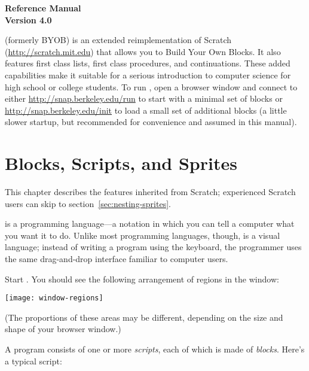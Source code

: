 \documentclass{report}
\begin{document}
\clearpage

\begin{center}
\bf \Huge \Snap{} Reference Manual \\
\huge Version 4.0
\vspace{40pt}
\end{center}

\Snap{} (formerly BYOB) is an extended reimplementation of Scratch (\url{http://scratch.mit.edu}) that allows you to Build Your Own Blocks. It also features first class lists, first class procedures, and continuations. These added capabilities make it suitable for a serious introduction to computer science for high school or college students.  To run \Snap{}, open a browser window and connect to either \url{http://snap.berkeley.edu/run} to start with a minimal set of blocks or \url{http://snap.berkeley.edu/init} to load a small set of additional blocks (a little slower startup, but recommended for convenience and assumed in this manual).

\clearpage

\chapter{Blocks, Scripts, and Sprites}

This chapter describes the \Snap{} features inherited from Scratch; experienced Scratch users can skip to section~\ref{sec:nesting-sprites}.

\Snap{} is a programming language---a notation in which you can tell a computer what you want it to do. Unlike most programming languages, though, \Snap{} is a visual language; instead of writing a program using the keyboard, the \Snap{} programmer uses the same drag-and-drop interface familiar to computer users.

Start \Snap{}. You should see the following arrangement of regions in the window:\nopagebreak

\begin{center}
\texttt{[image: window-regions]}
\end{center}

(The proportions of these areas may be different, depending on the size and shape of your browser window.)

A \Snap{} program consists of one or more \emph{scripts}, each of which is made of \emph{blocks}. Here's a typical script:\nopagebreak

\label{fig:typical-script}
\end{document}

